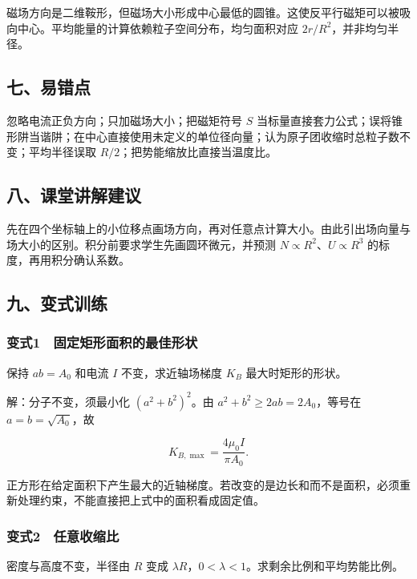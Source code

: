 \documentclass[12pt,a4paper,fontset=fandol]{ctexart}
\begin{document}
磁场方向是二维鞍形，但磁场大小形成中心最低的圆锥。这使反平行磁矩可以被吸向中心。平均能量的计算依赖粒子空间分布，均匀面积对应
\(2r/R^2\)，并非均匀半径。

\subsection{七、易错点}\label{ux4e03ux6613ux9519ux70b9-4}

忽略电流正负方向；只加磁场大小；把磁矩符号 \(S\)
当标量直接套力公式；误将锥形阱当谐阱；在中心直接使用未定义的单位径向量；认为原子团收缩时总粒子数不变；平均半径误取
\(R/2\)；把势能缩放比直接当温度比。

\subsection{八、课堂讲解建议}\label{ux516bux8bfeux5802ux8bb2ux89e3ux5efaux8bae-4}

先在四个坐标轴上的小位移点画场方向，再对任意点计算大小。由此引出场向量与场大小的区别。积分前要求学生先画圆环微元，并预测
\(N\propto R^2\)、\(U\propto R^3\) 的标度，再用积分确认系数。

\subsection{九、变式训练}\label{ux4e5dux53d8ux5f0fux8badux7ec3-4}

\subsubsection{变式1　固定矩形面积的最佳形状}\label{ux53d8ux5f0f1-ux56faux5b9aux77e9ux5f62ux9762ux79efux7684ux6700ux4f73ux5f62ux72b6}

保持 \(ab=A_0\) 和电流 \(I\) 不变，求近轴场梯度 \(K_B\)
最大时矩形的形状。

解：分子不变，须最小化 \((a^2+b^2)^2\)。由
\(a^2+b^2\ge2ab=2A_0\)，等号在 \(a=b=\sqrt{A_0}\)，故

\[\boxed{K_{B,\max}=\frac{4\mu_0I}{\pi A_0}.}\]

正方形在给定面积下产生最大的近轴梯度。若改变的是边长和而不是面积，必须重新处理约束，不能直接把上式中的面积看成固定值。

\subsubsection{变式2　任意收缩比}\label{ux53d8ux5f0f2-ux4efbux610fux6536ux7f29ux6bd4}

密度与高度不变，半径由 \(R\) 变成
\(\lambda R\)，\(0<\lambda<1\)。求剩余比例和平均势能比例。
\end{document}
